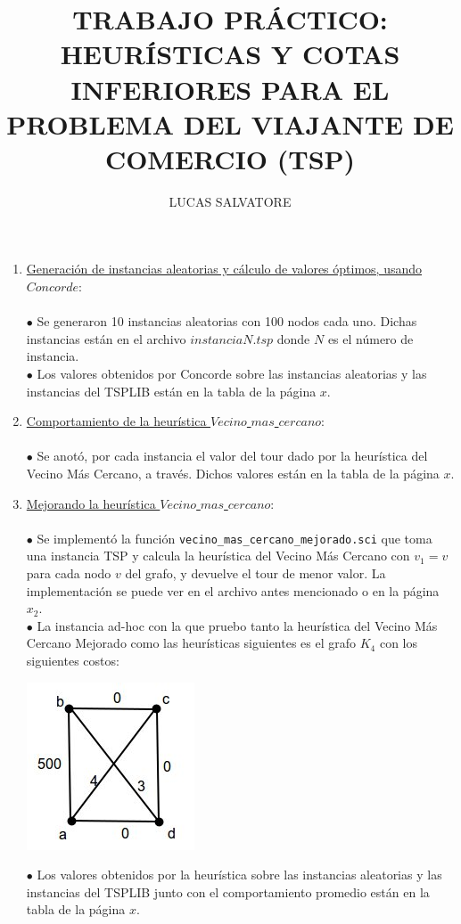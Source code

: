 \documentclass[10pt,a4paper]{report}
\title{TRABAJO PR\'ACTICO: HEUR\'ISTICAS Y COTAS INFERIORES PARA EL PROBLEMA DEL VIAJANTE DE COMERCIO (TSP)}
\author{LUCAS SALVATORE}
\date{}
\begin{document}
\maketitle
\begin{enumerate}
\item \underline{Generaci\'on de instancias aleatorias y c\'alculo de valores \'optimos, usando $Concorde$}:\\\\
$\bullet$ Se generaron 10 instancias aleatorias con 100 nodos cada uno. Dichas instancias est\'an en el archivo $instanciaN.tsp$ donde $N$ es el n\'umero de instancia.\\
$\bullet$ Los valores obtenidos por Concorde sobre las instancias aleatorias y las instancias del TSPLIB est\'an en la tabla de la p\'agina $x$.
\item \underline{Comportamiento de la heur\'istica $Vecino$ $mas$ $cercano$}:\\\\
$\bullet$ Se anot\'o, por cada instancia el valor del tour dado por la heur\'istica del Vecino M\'as Cercano, a trav\'es. Dichos valores est\'an en la tabla de la p\'agina $x$.
\item \underline{Mejorando la heur\'istica $Vecino$ $mas$ $cercano$}:\\\\
$\bullet$ Se implement\'o la funci\'on \texttt{vecino\_mas\_cercano\_mejorado.sci} que toma una instancia TSP y calcula la heur\'istica del Vecino M\'as Cercano con $v_1 = v$ para cada nodo $v$ del grafo, y devuelve el tour de menor valor. La implementaci\'on se puede ver en el archivo antes mencionado o en la p\'agina $x_2$.\\
$\bullet$ La instancia ad-hoc con la que pruebo tanto la heur\'istica del Vecino M\'as Cercano Mejorado como las heur\'isticas siguientes es el grafo $K_4$ con los siguientes costos:
\begin{center}
\includegraphics[scale=0.9]{K4.jpg}
\end{center}
$\bullet$ Los valores obtenidos por la heur\'istica sobre las instancias aleatorias y las instancias del TSPLIB junto con el comportamiento promedio est\'an en la tabla de la p\'agina $x$.

\end{enumerate}
\end{document}
